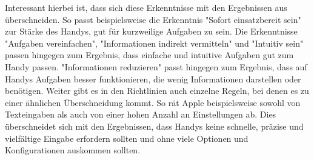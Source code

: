 %
%
Interessant hierbei ist, dass sich diese Erkenntnisse mit den Ergebnissen aus  überschneiden. %
	So passt beispielsweise die Erkenntnis "Sofort einsatzbereit sein" zur Stärke des Handys, gut für kurzweilige Aufgaben zu sein. Die Erkenntnisse "Aufgaben vereinfachen", "Informationen indirekt vermitteln" und "Intuitiv sein" passen hingegen zum Ergebnis, dass einfache und intuitive Aufgaben gut zum Handy passen.  "Informationen reduzieren" passt hingegen zum Ergebnis, dass auf Handys Aufgaben besser funktionieren, die wenig Informationen darstellen oder benötigen.\newline%
	Weiter gibt es in den Richtlinien auch einzelne Regeln, bei denen es zu einer ähnlichen Überschneidung kommt. 
		So rät Apple beispielsweise sowohl von Texteingaben als auch von einer hohen Anzahl an Einstellungen ab\cite{konventionen_enteringDate,konventionen_settings}. Dies überschneidet sich mit den Ergebnissen, dass Handys keine schnelle, präzise und vielfältige Eingabe erfordern sollten und ohne viele Optionen und Konfigurationen auskommen sollten.
